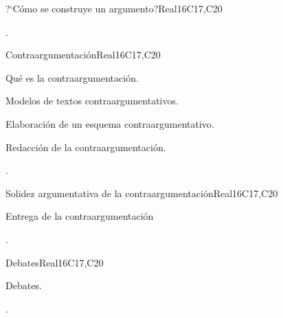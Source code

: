 \begin{syllabus}
\begin{unit}{?`Cómo se construye un argumento?}{}{Real}{16}{C17,C20}
  \begin{learningoutcomes}
   \item .%
  \end{learningoutcomes}
\end{unit}

\begin{unit}{Contraargumentación}{}{Real}{16}{C17,C20}
  \begin{topics}
      \item Qué es la contraargumentación.
      \item Modelos de textos contraargumentativos.
      \item Elaboración de un esquema contraargumentativo.
      \item Redacción de la contraargumentación.
  \end{topics}

  \begin{learningoutcomes}
   \item .%
  \end{learningoutcomes}
\end{unit}

\begin{unit}{Solidez argumentativa de la contraargumentación}{}{Real}{16}{C17,C20}
  \begin{topics}
      \item Entrega de la contraargumentación
  \end{topics}

  \begin{learningoutcomes}
   \item .%
  \end{learningoutcomes}
\end{unit}

\begin{unit}{Debates}{}{Real}{16}{C17,C20}
  \begin{topics}
      \item Debates.
  \end{topics}

  \begin{learningoutcomes} 
   \item .%
  \end{learningoutcomes}
\end{unit}



\begin{coursebibliography}
\end{coursebibliography}

\end{syllabus}
